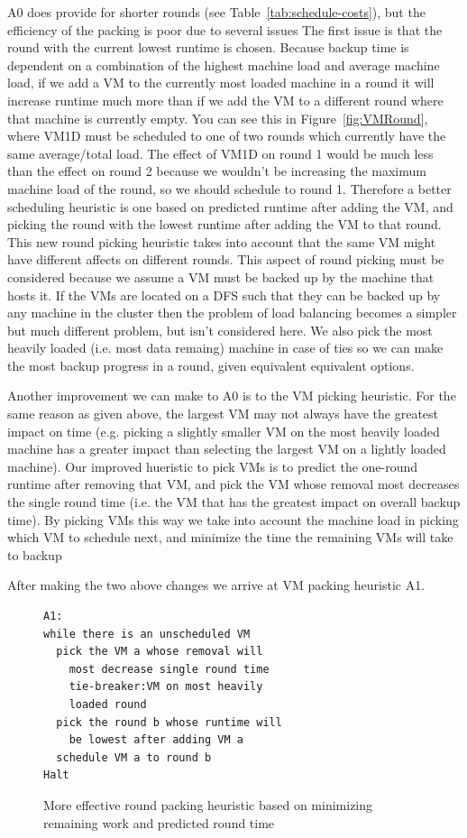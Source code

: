 A0 does provide for shorter rounds (see Table~\ref{tab:schedule-costs}), but
the efficiency of the packing is poor due to several issues
The first issue is that the round with the current lowest runtime
is chosen. Because backup time is dependent on a combination of the highest
machine load and average machine load, if we add a VM to the currently most
loaded machine in a round it will increase runtime much more than if we add the
VM to a different round where that machine is currently empty. You can see this
in Figure~\ref{fig:VMRound}, where VM1D must be scheduled to one of two rounds
which currently have the same average/total load. The effect of VM1D on round 1
would be much less than the effect on round 2 because we wouldn't be increasing
the maximum machine load of the round, so we should schedule to round 1.
Therefore a better
scheduling heuristic is one based on predicted runtime after adding the VM, and
picking the round with the lowest runtime after adding the VM to that round.
This new round picking heuristic
takes into account that the same VM might have different affects on different
rounds. This aspect of round picking must be considered because we assume a VM
must be backed
up by the machine that hosts it. If the VMs are located on a DFS such that they
can be
backed up by any machine in the cluster then the problem of load balancing
becomes a simpler but much different problem, but isn't considered here. We
also pick the most heavily loaded (i.e. most data remaing) machine in case of
ties so we can make the most backup progress in a round, given equivalent
equivalent options.

Another improvement we can make to A0 is to the VM picking heuristic. For the
same reason as given above, the largest VM may not always have the greatest
impact on time (e.g. picking a slightly smaller VM on the most heavily loaded
machine has a greater impact than selecting the largest VM on a lightly loaded
machine). Our improved hueristic to pick VMs is to predict the one-round
runtime after removing that VM, and pick the VM whose removal most
decreases the single round time (i.e. the VM that has the greatest impact on
overall backup time). By picking VMs this way we take into account
the machine load in picking which VM to schedule next, and minimize the time
the remaining VMs will take to backup

After making the two above changes we arrive at VM packing heuristic A1.

\begin{figure}
\begin{lstlisting}[frame=single]
A1:
while there is an unscheduled VM
  pick the VM a whose removal will
    most decrease single round time
    tie-breaker:VM on most heavily
    loaded round
  pick the round b whose runtime will
    be lowest after adding VM a
  schedule VM a to round b
Halt
\end{lstlisting}
\caption{More effective round packing heuristic based on minimizing remaining work and predicted round time}
\end{figure}

